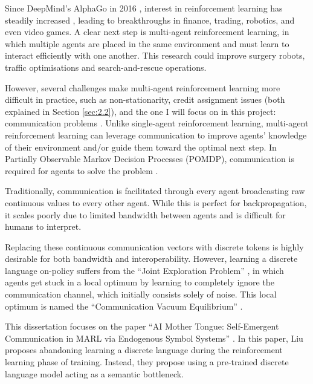 \label{sec:1}

Since DeepMind's AlphaGo in 2016 \cite{GoogleGo}, interest in reinforcement learning has steadily increased \cite{Overview}, leading to breakthroughs in finance, trading, robotics, and even video games.
A clear next step is multi-agent reinforcement learning, in which multiple agents are placed in the same environment and must learn to interact efficiently with one another.
This research could improve surgery robots, traffic optimisations and search-and-rescue operations.

However, several challenges make multi-agent reinforcement learning more difficult in practice, such as non-stationarity, credit assignment issues (both explained in Section \ref{sec:2.2}), and the one I will focus on in this project: communication problems \cite{SurveyofMARL}.
Unlike single-agent reinforcement learning, multi-agent reinforcement learning can leverage communication to improve agents' knowledge of their environment and/or guide them toward the optimal next step.
In Partially Observable Markov Decision Processes (POMDP), communication is required for agents to solve the problem \cite{POMDP-COM}.

Traditionally, communication is facilitated through every agent broadcasting raw continuous values to every other agent.
While this is perfect for backpropagation, it scales poorly due to limited bandwidth between agents and is difficult for humans to interpret.

Replacing these continuous communication vectors with discrete tokens is highly desirable for both bandwidth and interoperability.
However, learning a discrete language on-policy suffers from the ``Joint Exploration Problem'' \cite{Biases}, in which agents get stuck in a local optimum by learning to completely ignore the communication channel, which initially consists solely of noise.
This local optimum is named the ``Communication Vacuum Equilibrium'' \cite{Biases}.

This dissertation focuses on the paper ``AI Mother Tongue: Self-Emergent Communication in MARL via Endogenous Symbol Systems'' \cite{AIMotherTongue}.
In this paper, Liu proposes abandoning learning a discrete language during the reinforcement learning phase of training.
Instead, they propose using a pre-trained discrete language model acting as a semantic bottleneck.

